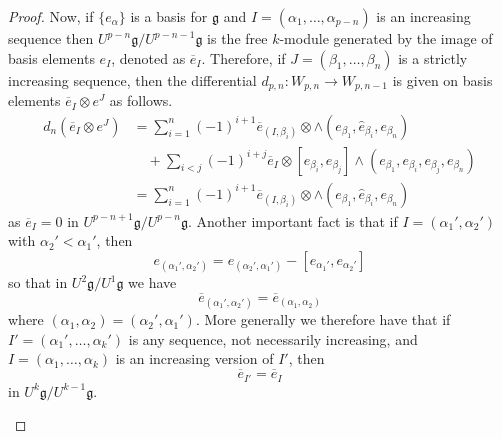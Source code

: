 \begin{proof}
  Now, if $ \{e_{\alpha}\} $ is a basis for $ \mathfrak{g} $ and $ I = (\alpha_1, \ldots, \alpha_{p - n}) $ is an increasing sequence then $ U^{p - n}\mathfrak{g}/U^{p - n -1}\mathfrak{g} $ is the free $ k $-module generated by the image of basis elements $ e_{I} $, denoted as $ \overline{e}_{I} $. Therefore, if $ J = (\beta_1, \ldots, \beta_n) $ is a strictly increasing sequence, then the differential $ d_{p, n}: W_{p, n} \to W_{p, n- 1} $ is given on basis elements $ \overline{e}_{I} \otimes e^{J} $ as follows.
  \begin{align*}
    d_n(\overline{e}_{I} \otimes e^{J}) &= \sum_{i = 1}^{n} (-1)^{i + 1} \overline{e}_{(I, \beta_i)} \otimes \wedge(e_{\beta_1}, \widehat{e}_{\beta_i}, e_{\beta_n}) \\
                                        &\quad+ \sum_{i < j} (-1)^{i + j} \overline{e}_{I} \otimes [e_{\beta_i}, e_{\beta_j}] \wedge(e_{\beta_1}, e_{\beta_i}, e_{\beta_j}, e_{\beta_n}) \\
                                        &= \sum_{i = 1}^{n} (-1)^{i + 1} \overline{e}_{(I, \beta_i)} \otimes \wedge(e_{\beta_1}, \widehat{e}_{\beta_i}, e_{\beta_n})
  \end{align*}
  as $ \overline{e}_{I} = 0 $ in $ U^{p - n + 1}\mathfrak{g}/U^{p - n}\mathfrak{g} $. Another important fact is that if $ I = (\alpha_1', \alpha_2') $ with $ \alpha_2' < \alpha_1' $, then
  \begin{equation}
    e_{(\alpha_1', \alpha_2')} = e_{(\alpha_2', \alpha_1')} - [e_{\alpha_1'}, e_{\alpha_2'}]
  \end{equation}
  so that in $ U^2\mathfrak{g}/U^{1}{\mathfrak{g}} $ we have
  \begin{equation}
    \overline{e}_{(\alpha_1', \alpha_2')} = \overline{e}_{(\alpha_1, \alpha_2)}
  \end{equation}
  where $ (\alpha_1, \alpha_2) = (\alpha_2', \alpha_1') $. More generally we therefore have that if $ I' = (\alpha_1', \ldots, \alpha_k') $ is any sequence, not necessarily increasing, and $ I = (\alpha_1, \ldots, \alpha_k) $ is an increasing version of $ I' $, then
  \begin{equation}
    \overline{e}_{I'} = \overline{e}_{I}
  \end{equation}
  in $ U^{k}\mathfrak{g}/U^{k - 1}\mathfrak{g} $.

  \begin{figure}[t]
    \begin{center}
\end{center}
\end{figure}
\end{proof}
